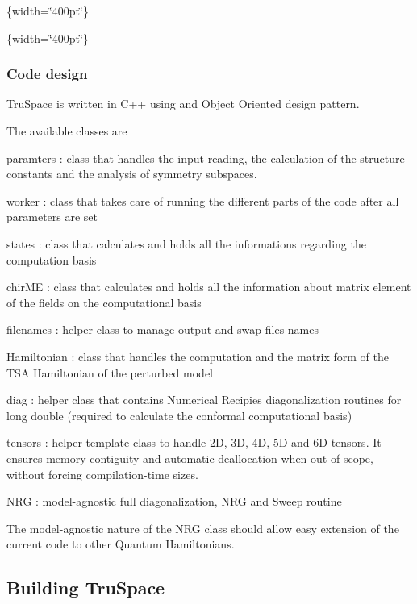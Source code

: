 \{width=\char`\"{}400pt\char`\"{}\}

\{width=\char`\"{}400pt\char`\"{}\}

\subsubsection*{Code design}

Tru\+Space is written in C++ using and Object Oriented design pattern.

The available classes are


\begin{DoxyItemize}
\item paramters \+: class that handles the input reading, the calculation of the structure constants and the analysis of symmetry subspaces.
\item worker \+: class that takes care of running the different parts of the code after all parameters are set
\item states \+: class that calculates and holds all the informations regarding the computation basis
\item chir\+ME \+: class that calculates and holds all the information about matrix element of the fields on the computational basis
\item filenames \+: helper class to manage output and swap files names
\item Hamiltonian \+: class that handles the computation and the matrix form of the T\+SA Hamiltonian of the perturbed model
\item diag \+: helper class that contains Numerical Recipies diagonalization routines for long double (required to calculate the conformal computational basis)
\item tensors \+: helper template class to handle 2D, 3D, 4D, 5D and 6D tensors. It ensures memory contiguity and automatic deallocation when out of scope, without forcing compilation-\/time sizes.
\item N\+RG \+: model-\/agnostic full diagonalization, {\ttfamily N\+RG} and {\ttfamily Sweep} routine
\end{DoxyItemize}

The model-\/agnostic nature of the N\+RG class should allow easy extension of the current code to other Quantum Hamiltonians.

\subsection*{Building Tru\+Space }

